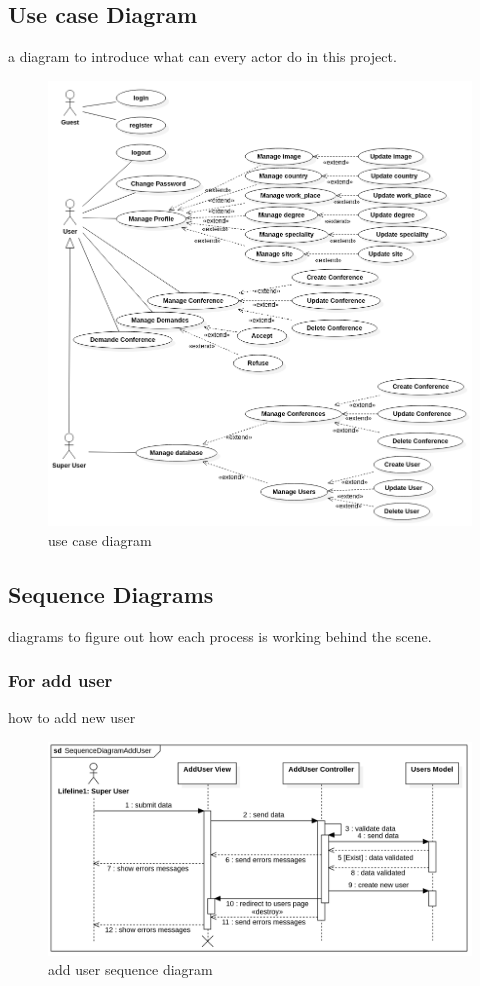 \documentclass[12pt,a4paper]{article}
\begin{document}
	\subsection{Use case Diagram}
	a diagram to introduce what can every actor do in this project.
	
		\begin{figure}[!h]
			\centering
			\includegraphics[width=\textwidth]{diagrams/use_case.png}
			\caption{use case diagram}
			\label{fig:use-case-d}
		\end{figure}

	\subsection{Sequence Diagrams}
	diagrams to figure out how each process is working behind the scene.
		\subsubsection{For add user}
		how to add new user
		
			\begin{figure}[!h]
				\centering
				\includegraphics[width=\textwidth]{diagrams/add_user_sequence.png}
				\caption{add user sequence diagram}
				\label{fig:add-user-s-d}
			\end{figure}
		
\end{document}
